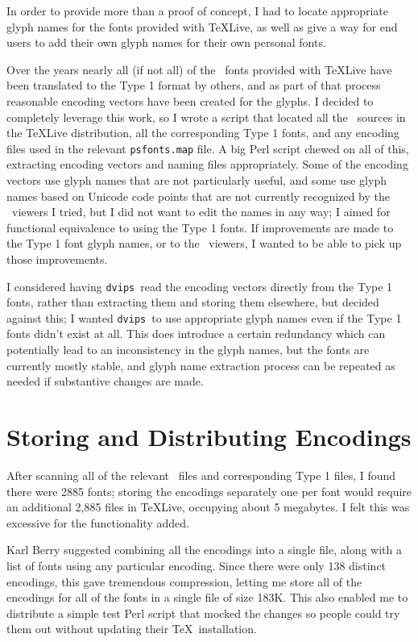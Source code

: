 \documentclass{ltugboat}
\def\PDF{\acro{PDF}}
\def\dvips{\texttt{dvips}}
\begin{document}
In order to provide more than a proof of concept, I had to
locate appropriate glyph names for the fonts provided with
\TeX Live, as well as give a way for end users to add their
own glyph names for their own personal fonts.

Over the years nearly all (if not all) of the \MF\ fonts
provided with \TeX Live have been translated to the Type 1
format by others, and as part of that process reasonable
encoding vectors have been created for the glyphs.  I
decided to completely leverage this work, so I wrote a
script that located all the \MF\ sources in the \TeX Live
distribution, all the corresponding Type 1 fonts, and any
encoding files used in the relevant \texttt{psfonts.map}
file.  A big Perl script chewed on all of this, extracting
encoding vectors and naming files appropriately.  Some of
the encoding vectors use glyph names that are not particularly
useful, and some use glyph names based on Unicode code
points that are not currently recognized by the \PDF\ viewers
I tried, but I did not want to edit the names in any way;
I aimed for functional equivalence to using the Type 1
fonts.  If improvements are made to the Type 1 font glyph
names, or to the \PDF\ viewers, I wanted to be able to pick
up those improvements.

I considered having \dvips\ read the encoding vectors
directly from the Type 1 fonts, rather than extracting them
and storing them elsewhere, but decided against this; I wanted
\dvips\ to use appropriate glyph names even if the Type 1
fonts didn't exist at all.  This does introduce a certain
redundancy which can potentially lead to an inconsistency in
the glyph names, but the fonts are currently mostly stable, and
glyph name extraction process can be
repeated as needed if substantive changes are made.

\section{Storing and Distributing Encodings}

After scanning all of the relevant \MF\ files and corresponding
Type 1 files, I found there were 2885 fonts; storing the
encodings separately one per font would require an additional
2,885 files in \TeX Live, occupying about 5 megabytes.  I felt
this was excessive for the functionality added.

Karl Berry suggested combining all the encodings into a single
file, along with a list of fonts using any particular encoding.
Since there were only 138 distinct encodings, this gave
tremendous compression, letting me store all of the encodings
for all of the fonts in a single file of size 183K.  This also
enabled me to distribute a simple test Perl script that mocked
the changes so people could try them out without updating their
\TeX\ installation.
\end{document}
